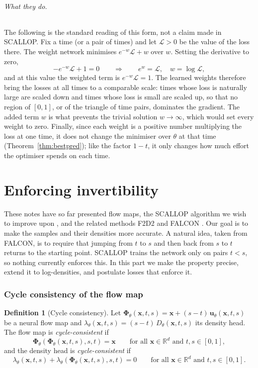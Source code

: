 \documentclass[11pt,a4paper]{article}
\numberwithin{equation}{section}     %
\theoremstyle{plain}        %
\theoremstyle{definition}   %
\newtheorem{definition}[theorem]{Definition}
\theoremstyle{remark}       %
\begin{document}
\paragraph{What they do.} The following is the standard reading of this form, not a claim made in SCALLOP. Fix a time (or a pair of times) and let $\mathcal{L}>0$ be the value of the loss there. The weight network minimises $e^{-w}\mathcal{L}+w$ over $w$. Setting the derivative to zero,
\[
-e^{-w}\mathcal{L}+1=0\qquad\Longrightarrow\qquad e^{w}=\mathcal{L},\quad w=\log\mathcal{L},
\]
and at this value the weighted term is $e^{-w}\mathcal{L}=1$. The learned weights therefore bring the losses at all times to a comparable scale: times whose loss is naturally large are scaled down and times whose loss is small are scaled up, so that no region of $[0,1]$, or of the triangle of time pairs, dominates the gradient. The added term $w$ is what prevents the trivial solution $w\to\infty$, which would set every weight to zero. Finally, since each weight is a positive number multiplying the loss at one time, it does not change the minimiser over $\theta$ at that time (Theorem~\ref{thm:bestpred}); like the factor $1-t$, it only changes how much effort the optimiser spends on each time.

\newpage

\part{Enforcing invertibility}\label{part:three}

These notes have so far presented flow maps, the SCALLOP algorithm we wish to improve upon \citep{ouyang2026}, and the related methods F2D2 \citep{ai2026} and FALCON \citep{rehman2026}. Our goal is to make the samples and their densities more accurate. A natural idea, taken from FALCON, is to require that jumping from $t$ to $s$ and then back from $s$ to $t$ returns to the starting point. SCALLOP trains the network only on pairs $t<s$, so nothing currently enforces this. In this part we make the property precise, extend it to log-densities, and postulate losses that enforce it.

\section{Cycle consistency of the flow map}\label{sec:cyclemap}

\begin{definition}[Cycle consistency]\label{def:cycle}
Let $\boldsymbol{\Phi}_\theta(\mathbf{x},t,s)=\mathbf{x}+(s-t)\,\mathbf{u}_\theta(\mathbf{x},t,s)$ be a neural flow map and $\lambda_\theta(\mathbf{x},t,s)=(s-t)\,D_\theta(\mathbf{x},t,s)$ its density head. The flow map is \emph{cycle-consistent} if
\[
\boldsymbol{\Phi}_\theta\left(\boldsymbol{\Phi}_\theta(\mathbf{x},t,s),s,t\right)=\mathbf{x}\qquad\text{for all }\mathbf{x}\in\mathbb{R}^d\text{ and }t,s\in[0,1],
\]
and the density head is \emph{cycle-consistent} if
\[
\lambda_\theta(\mathbf{x},t,s)+\lambda_\theta\left(\boldsymbol{\Phi}_\theta(\mathbf{x},t,s),s,t\right)=0\qquad\text{for all }\mathbf{x}\in\mathbb{R}^d\text{ and }t,s\in[0,1].
\]
\end{definition}
\end{document}
